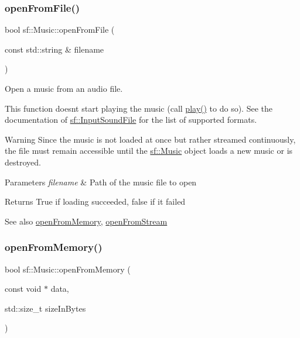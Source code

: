 \subsubsection{\texorpdfstring{openFromFile()}{openFromFile()}}
{\footnotesize\ttfamily bool sf\+::\+Music\+::open\+From\+File (\begin{DoxyParamCaption}\item[{const std\+::string \&}]{filename }\end{DoxyParamCaption})}



Open a music from an audio file. 

This function doesn\textquotesingle{}t start playing the music (call \mbox{\hyperlink{classsf_1_1_sound_stream_afdc08b69cab5f243d9324940a85a1144}{play()}} to do so). See the documentation of \mbox{\hyperlink{classsf_1_1_input_sound_file}{sf\+::\+Input\+Sound\+File}} for the list of supported formats.

\begin{DoxyWarning}{Warning}
Since the music is not loaded at once but rather streamed continuously, the file must remain accessible until the \mbox{\hyperlink{classsf_1_1_music}{sf\+::\+Music}} object loads a new music or is destroyed.
\end{DoxyWarning}

\begin{DoxyParams}{Parameters}
{\em filename} & Path of the music file to open\\
\hline
\end{DoxyParams}
\begin{DoxyReturn}{Returns}
True if loading succeeded, false if it failed
\end{DoxyReturn}
\begin{DoxySeeAlso}{See also}
\mbox{\hyperlink{classsf_1_1_music_ae93b21bcf28ff0b5fec458039111386e}{open\+From\+Memory}}, \mbox{\hyperlink{classsf_1_1_music_a4e55d1910a26858b44778c26b237d673}{open\+From\+Stream}} \begin{DoxyVerb}\end{DoxyVerb}
 
\end{DoxySeeAlso}
\mbox{\label{classsf_1_1_music_ae93b21bcf28ff0b5fec458039111386e}} 
\subsubsection{\texorpdfstring{openFromMemory()}{openFromMemory()}}
{\footnotesize\ttfamily bool sf\+::\+Music\+::open\+From\+Memory (\begin{DoxyParamCaption}\item[{const void $\ast$}]{data,  }\item[{std\+::size\+\_\+t}]{size\+In\+Bytes }\end{DoxyParamCaption})}



